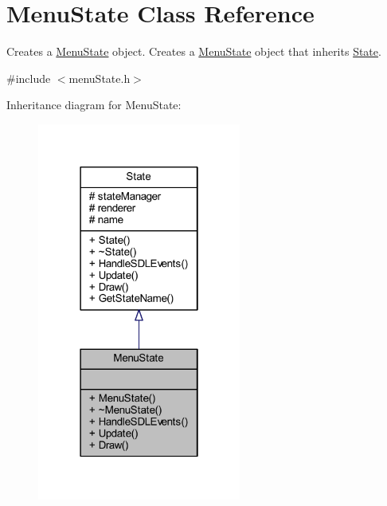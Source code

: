 \hypertarget{class_menu_state}{\section{Menu\+State Class Reference}
\label{class_menu_state}
}


Creates a \hyperlink{class_menu_state}{Menu\+State} object. Creates a \hyperlink{class_menu_state}{Menu\+State} object that inherits \hyperlink{class_state}{State}.  




{\ttfamily \#include $<$menu\+State.\+h$>$}



Inheritance diagram for Menu\+State\+:
\nopagebreak
\begin{figure}[H]
\begin{center}
\leavevmode
\includegraphics[width=190pt]{class_menu_state__inherit__graph}
\end{center}
\end{figure}


